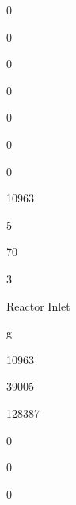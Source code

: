 \documentclass[a4paper,portrait,12pt]{article}
\begin{document}
0





0





0





0





0





0





0





10963





5





70





3





\begin{flushleft}
Reactor Inlet
\end{flushleft}





\begin{flushleft}
g
\end{flushleft}





10963





39005





128387





0





0





0
\end{document}
